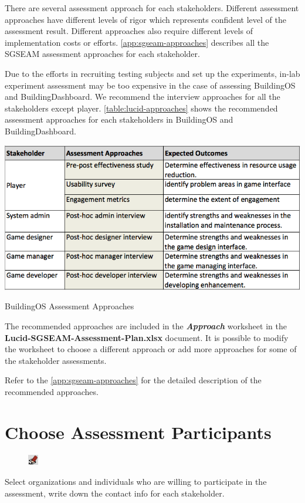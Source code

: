 \documentclass[11pt,oneside]{book}
\begin{document}
There are several assessment approach for each stakeholders. Different assessment approaches have different levels of rigor which represents confident level of the assessment result. Different approaches also require different levels of implementation costs or efforts. \autoref{app:sgseam-approaches} describes all the SGSEAM assessment approaches for each stakeholder. 

Due to the efforts in recruiting testing subjects and set up the experiments, in-lab experiment assessment may be too expensive in the case of assessing BuildingOS and BuildingDashboard. We recommend the interview approaches for all the stakeholders except player. \autoref{table:lucid-approaches} shows the recommended assessment approaches for each stakeholders in BuildingOS and BuildingDashboard. 
 
\begin{table}[ht!]
  \center
  \includegraphics[width=0.75\columnwidth]{approach}
  \caption{BuildingOS Assessment Approaches}
  \label{table:lucid-approaches}
\end{table}

The recommended approaches are included in the \textbf{\textit{Approach}} worksheet in the \textbf{Lucid-SGSEAM-Assessment-Plan.xlsx} document. It is possible to modify the worksheet to choose a different approach or add more approaches for some of the stakeholder assessments.

Refer to the \autoref{app:sgseam-approaches}  for the detailed description of the recommended approaches.

\section{Choose Assessment Participants}
\begin{shadebox}
\begin{figure}
\vspace{-15pt}\hspace{-10pt}
    \includegraphics[width=0.04\textwidth]{note-icon}
\end{figure}
Select organizations and individuals who are willing to participate in the assessment, write down the contact info for each stakeholder.
\end{shadebox}
\end{document}
